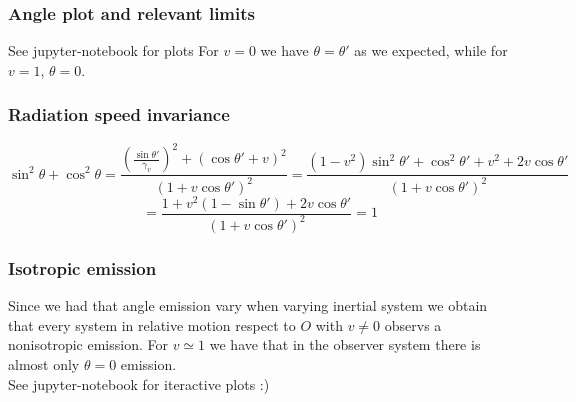 \documentclass[main.tex]{subfiles}
\begin{document}
\subsubsection{Angle plot and relevant limits}
See jupyter-notebook for plots
For $v=0$ we have $\theta=\theta'$ as we expected, while for $v=1$, $\theta = 0$.
\subsubsection{Radiation speed invariance}
\[ \sin^2\theta + \cos^2\theta = \frac{(\frac{\sin\theta'}{\gamma_v})^2 + (\cos\theta' + v)^2}{(1 + v\cos\theta')^2} = \frac{(1-v^2)\sin^2\theta' + \cos^2\theta' + v^2 + 2v\cos\theta'}{(1 + v\cos\theta')^2} \]
\[ = \frac{1+v^2(1-\sin\theta')+2v\cos\theta'}{(1 + v\cos\theta')^2} = 1 \]
\subsubsection{Isotropic emission}

Since we had that angle emission vary when varying inertial system we obtain that every system in relative motion respect to $O$ with $v\neq 0$ observs a nonisotropic emission. For $v\simeq 1$ we have that in the observer system there is almost only $\theta = 0$ emission.\\
See jupyter-notebook for iteractive plots :)
\end{document}
